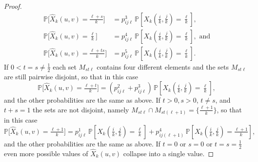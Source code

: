 \documentclass[10pt,a4paper]{amsart}
\newcommand{\PP}{\mathbb{P}}
\newcommand{\Xhat}{\widehat{X}}
\begin{document}
\begin{proof}
\begin{align*}
    \PP\big[\Xhat_k(u,v) = \tfrac{\ell+s}{k}\big] &= p_{ij\ell}^3\, \PP[X_k(\tfrac{i}{k},\tfrac{j}{k}) = \tfrac{\ell}{k}], \\
    \PP\big[\Xhat_k(u,v) = \tfrac{\ell}{k}\big] &= p_{ij\ell}^4\, \PP[X_k(\tfrac{i}{k},\tfrac{j}{k}) = \tfrac{\ell}{k}], \text{ and}\\
    \PP\big[\Xhat_k(u,v) = \tfrac{\ell+ts}{k}\big] &= p_{ij\ell}^5\, \PP[X_k(\tfrac{i}{k},\tfrac{j}{k}) = \tfrac{\ell}{k}]. 
\end{align*}
If $0 < t = s \ne \tfrac12$ each set $M_{st\ell}$ contains four different elements and the sets $M_{st\ell}$ are still pairwise disjoint, so that in this case
$$\PP\big[\Xhat_k(u,v) = \tfrac{\ell+t}{k}\big] = (p_{ij\ell}^2 + p_{ij\ell}^3)\, \PP[X_k(\tfrac{i}{k},\tfrac{j}{k}) = \tfrac{\ell}{k}],$$
and the other probabilities are the same as above. If $t > 0, s > 0$, $t\ne s$, and $t+s=1$ the sets are not disjoint, namely $M_{st\ell} \cap M_{st(\ell+1)} = \{\tfrac{\ell+1}{k}\}$, so that in this case
$$\PP\big[\Xhat_k(u,v) = \tfrac{\ell+1}{k}\big] = p_{ij\ell}^1\, \PP[X_k(\tfrac{i}{k},\tfrac{j}{k}) = \tfrac{\ell}{k}] + p_{ij(\ell+1)}^4\, \PP[X_k(\tfrac{i}{k},\tfrac{j}{k}) = \tfrac{\ell+1}{k}],$$
and the other probabilities are the same as above. If $t=0$ or $s=0$ or $t=s=\tfrac12$ even more possible values of $\Xhat_k(u,v)$ collapse into a single value. 


\end{proof}
\end{document}
